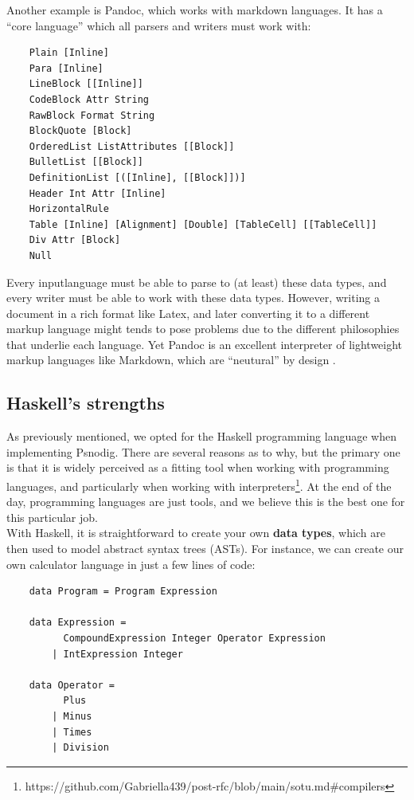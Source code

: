 Another example is Pandoc, which works with markdown languages. It has a ``core language'' which all parsers and writers must work with:

\begin{verbatim}
    Plain [Inline]
    Para [Inline]
    LineBlock [[Inline]]
    CodeBlock Attr String
    RawBlock Format String
    BlockQuote [Block]
    OrderedList ListAttributes [[Block]]
    BulletList [[Block]]
    DefinitionList [([Inline], [[Block]])]
    Header Int Attr [Inline]
    HorizontalRule
    Table [Inline] [Alignment] [Double] [TableCell] [[TableCell]]
    Div Attr [Block]
    Null
\end{verbatim}


Every inputlanguage must be able to parse to (at least) these data types, and every writer must be able to work with these data types. However, writing a document in a rich format like Latex, and later converting it to a different markup language might tends to pose problems due to the different philosophies that underlie each language. Yet Pandoc is an excellent interpreter of lightweight markup languages like Markdown, which are ``neutural'' by design \cite{dominici2014}.

\subsection{Haskell's strengths}
As previously mentioned, we opted for the Haskell programming language when implementing Psnodig. There are several reasons as to why, but the primary one is that it is widely perceived as a fitting tool when working with programming languages, and particularly when working with interpreters\footnote{https://github.com/Gabriella439/post-rfc/blob/main/sotu.md\#compilers}. At the end of the day, programming languages are just tools, and we believe this is the best one for this particular job. \hfill \\

With Haskell, it is straightforward to create your own \textbf{data types}, which are then used to model abstract syntax trees (ASTs). For instance, we can create our own calculator language in just a few lines of code:

\begin{verbatim}
    data Program = Program Expression

    data Expression =
          CompoundExpression Integer Operator Expression
        | IntExpression Integer

    data Operator =
          Plus
        | Minus
        | Times
        | Division
\end{verbatim}

